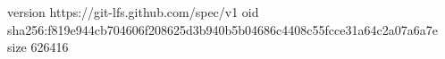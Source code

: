 version https://git-lfs.github.com/spec/v1
oid sha256:f819e944cb704606f208625d3b940b5b04686c4408c55fcce31a64c2a07a6a7e
size 626416
